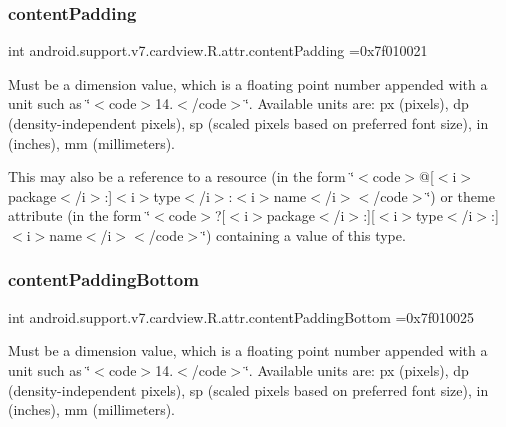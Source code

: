 \subsubsection{\texorpdfstring{content\+Padding}{contentPadding}}
{\footnotesize\ttfamily int android.\+support.\+v7.\+cardview.\+R.\+attr.\+content\+Padding =0x7f010021\hspace{0.3cm}{\ttfamily [static]}}

Must be a dimension value, which is a floating point number appended with a unit such as \char`\"{}$<$code$>$14.\+5sp$<$/code$>$\char`\"{}. Available units are\+: px (pixels), dp (density-\/independent pixels), sp (scaled pixels based on preferred font size), in (inches), mm (millimeters). 

This may also be a reference to a resource (in the form \char`\"{}$<$code$>$@\mbox{[}$<$i$>$package$<$/i$>$\+:\mbox{]}$<$i$>$type$<$/i$>$\+:$<$i$>$name$<$/i$>$$<$/code$>$\char`\"{}) or theme attribute (in the form \char`\"{}$<$code$>$?\mbox{[}$<$i$>$package$<$/i$>$\+:\mbox{]}\mbox{[}$<$i$>$type$<$/i$>$\+:\mbox{]}$<$i$>$name$<$/i$>$$<$/code$>$\char`\"{}) containing a value of this type. \mbox{\label{classandroid_1_1support_1_1v7_1_1cardview_1_1R_1_1attr_a49d455b8fac184949496acb1dc210bf9}} 
\subsubsection{\texorpdfstring{content\+Padding\+Bottom}{contentPaddingBottom}}
{\footnotesize\ttfamily int android.\+support.\+v7.\+cardview.\+R.\+attr.\+content\+Padding\+Bottom =0x7f010025\hspace{0.3cm}{\ttfamily [static]}}

Must be a dimension value, which is a floating point number appended with a unit such as \char`\"{}$<$code$>$14.\+5sp$<$/code$>$\char`\"{}. Available units are\+: px (pixels), dp (density-\/independent pixels), sp (scaled pixels based on preferred font size), in (inches), mm (millimeters). 

